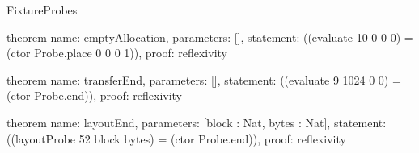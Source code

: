 \begin{lexlean}{FixtureProbes}
\begin{semanticmodule}
theorem{
  name: emptyAllocation,
  parameters: [],
  statement: ((evaluate 10 0 0 0) = (ctor Probe.place 0 0 0 1)),
  proof: reflexivity{}
}

theorem{
  name: transferEnd,
  parameters: [],
  statement: ((evaluate 9 1024 0 0) = (ctor Probe.end)),
  proof: reflexivity{}
}

theorem{
  name: layoutEnd,
  parameters: [block : Nat, bytes : Nat],
  statement: ((layoutProbe 52 block bytes) = (ctor Probe.end)),
  proof: reflexivity{}
}
\end{semanticmodule}
\end{lexlean}
